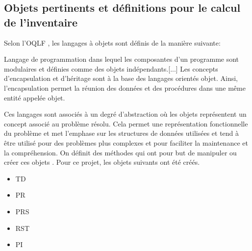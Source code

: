     \subsection{Objets pertinents et définitions pour le calcul de l'inventaire}
        Selon l'\ac{OQLF} \parencite{oqlf_langage_2006}, les langages à objets sont définis de la manière suivante: 
        \begin{definition}
            Langage de programmation dans lequel les composantes d'un programme sont modulaires et définies comme des objets indépendants.[...] Les concepts d'encapsulation et d'héritage sont à la base des langages orientés objet. Ainsi, l'encapsulation permet la réunion des données et des procédures dans une même entité appelée objet.
        \end{definition}
        Ces langages sont associés à un degré d'abstraction où les objets représentent un concept associé au problème résolu. Cela permet une représentation fonctionnelle du problème et met l'emphase sur les structures de données utilisées et tend à être utilisé pour des problèmes plus complexes et pour faciliter la maintenance et la compréhension. On définit des méthodes qui ont pour but de manipuler ou créer ces objets \parencite{lawhead_learning_2023}. Pour ce projet, les objets suivants ont été créés.
        \begin{itemize}
            \item \ac{TD}
            \item \ac{PR}
            \item \ac{PRS}
            \item \ac{RST}
            \item \ac{PI}
        \end{itemize}
